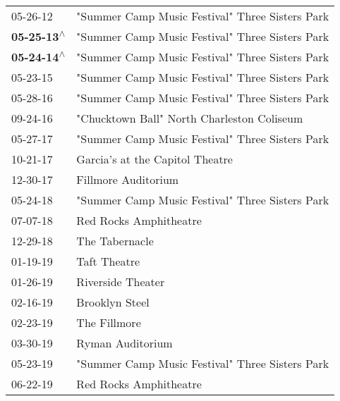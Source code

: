 \begin{supertabular}{ll}
                  05-26-12\textsuperscript{} &  "Summer Camp Music Festival" Three Sisters Park \\
 \textbf{05-25-13\textsuperscript{$\wedge$}} &  "Summer Camp Music Festival" Three Sisters Park \\
 \textbf{05-24-14\textsuperscript{$\wedge$}} &  "Summer Camp Music Festival" Three Sisters Park \\
                  05-23-15\textsuperscript{} &  "Summer Camp Music Festival" Three Sisters Park \\
                  05-28-16\textsuperscript{} &  "Summer Camp Music Festival" Three Sisters Park \\
                  09-24-16\textsuperscript{} &       "Chucktown Ball" North Charleston Coliseum \\
                  05-27-17\textsuperscript{} &  "Summer Camp Music Festival" Three Sisters Park \\
                  10-21-17\textsuperscript{} &                  Garcia’s at the Capitol Theatre \\
                  12-30-17\textsuperscript{} &                              Fillmore Auditorium \\
                  05-24-18\textsuperscript{} &  "Summer Camp Music Festival" Three Sisters Park \\
                  07-07-18\textsuperscript{} &                           Red Rocks Amphitheatre \\
                  12-29-18\textsuperscript{} &                                   The Tabernacle \\
                  01-19-19\textsuperscript{} &                                     Taft Theatre \\
                  01-26-19\textsuperscript{} &                                Riverside Theater \\
                  02-16-19\textsuperscript{} &                                   Brooklyn Steel \\
                  02-23-19\textsuperscript{} &                                     The Fillmore \\
                  03-30-19\textsuperscript{} &                                 Ryman Auditorium \\
                  05-23-19\textsuperscript{} &  "Summer Camp Music Festival" Three Sisters Park \\
                  06-22-19\textsuperscript{} &                           Red Rocks Amphitheatre \\

\end{supertabular}

